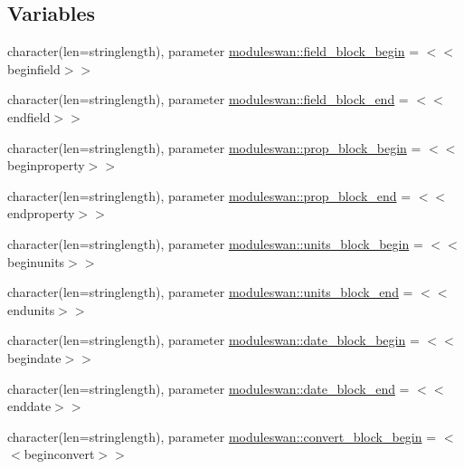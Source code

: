 \subsection*{Variables}
\begin{DoxyCompactItemize}
\item 
character(len=stringlength), parameter \mbox{\hyperlink{namespacemoduleswan_af262e5ee084e83d947faf8fe673eedba}{moduleswan\+::field\+\_\+block\+\_\+begin}} = \textquotesingle{}$<$$<$beginfield$>$$>$\textquotesingle{}
\item 
character(len=stringlength), parameter \mbox{\hyperlink{namespacemoduleswan_a725d01d351dc51cdd8457e9307160045}{moduleswan\+::field\+\_\+block\+\_\+end}} = \textquotesingle{}$<$$<$endfield$>$$>$\textquotesingle{}
\item 
character(len=stringlength), parameter \mbox{\hyperlink{namespacemoduleswan_a709bb35abf9448cad048a720a8026488}{moduleswan\+::prop\+\_\+block\+\_\+begin}} = \textquotesingle{}$<$$<$beginproperty$>$$>$\textquotesingle{}
\item 
character(len=stringlength), parameter \mbox{\hyperlink{namespacemoduleswan_af8388be7d822a28085ad5d49202c5594}{moduleswan\+::prop\+\_\+block\+\_\+end}} = \textquotesingle{}$<$$<$endproperty$>$$>$\textquotesingle{}
\item 
character(len=stringlength), parameter \mbox{\hyperlink{namespacemoduleswan_aee5466ad2e84fab2104f2237dbefc18c}{moduleswan\+::units\+\_\+block\+\_\+begin}} = \textquotesingle{}$<$$<$beginunits$>$$>$\textquotesingle{}
\item 
character(len=stringlength), parameter \mbox{\hyperlink{namespacemoduleswan_acc49f731e5b61076515a1cd444d0cdc3}{moduleswan\+::units\+\_\+block\+\_\+end}} = \textquotesingle{}$<$$<$endunits$>$$>$\textquotesingle{}
\item 
character(len=stringlength), parameter \mbox{\hyperlink{namespacemoduleswan_a8c8326671daffe1b4b08ebc63b54b443}{moduleswan\+::date\+\_\+block\+\_\+begin}} = \textquotesingle{}$<$$<$begindate$>$$>$\textquotesingle{}
\item 
character(len=stringlength), parameter \mbox{\hyperlink{namespacemoduleswan_a9443aa6ce9e6b9a8f827fdf6f0495866}{moduleswan\+::date\+\_\+block\+\_\+end}} = \textquotesingle{}$<$$<$enddate$>$$>$\textquotesingle{}
\item 
character(len=stringlength), parameter \mbox{\hyperlink{namespacemoduleswan_a04c38ac30f15d12e0dbd95367f681790}{moduleswan\+::convert\+\_\+block\+\_\+begin}} = \textquotesingle{}$<$$<$beginconvert$>$$>$\textquotesingle{}

\end{DoxyCompactItemize}
